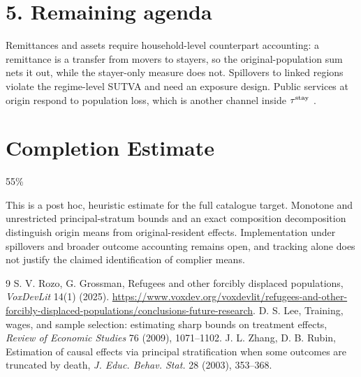 \documentclass[11pt]{article}
\theoremstyle{definition}
\begin{document}
\section*{5. Remaining agenda}
Remittances and assets require household-level counterpart accounting: a remittance is a transfer from movers to stayers,
so the original-population sum nets it out, while the stayer-only measure does not. Spillovers to linked regions violate the
regime-level SUTVA and need an exposure design. Public services at origin respond to population loss, which is another
channel inside $\tau^{\rm stay}$ \cite{rg}.

\section{Completion Estimate}
55\%

This is a post hoc, heuristic estimate for the full catalogue target.
Monotone and unrestricted principal-stratum bounds and an exact composition decomposition distinguish origin means from original-resident effects. Implementation under spillovers and broader outcome accounting remains open, and tracking alone does not justify the claimed identification of complier means.

\begin{thebibliography}{9}
 S. V. Rozo, G. Grossman, Refugees and other forcibly displaced populations, \emph{VoxDevLit} 14(1) (2025). \url{https://www.voxdev.org/voxdevlit/refugees-and-other-forcibly-displaced-populations/conclusions-future-research}.
 D. S. Lee, Training, wages, and sample selection: estimating sharp bounds on treatment effects, \emph{Review of Economic Studies} 76 (2009), 1071--1102.
 J. L. Zhang, D. B. Rubin, Estimation of causal effects via principal stratification when some outcomes are truncated by death, \emph{J. Educ. Behav. Stat.} 28 (2003), 353--368.
\end{thebibliography}
\end{document}
